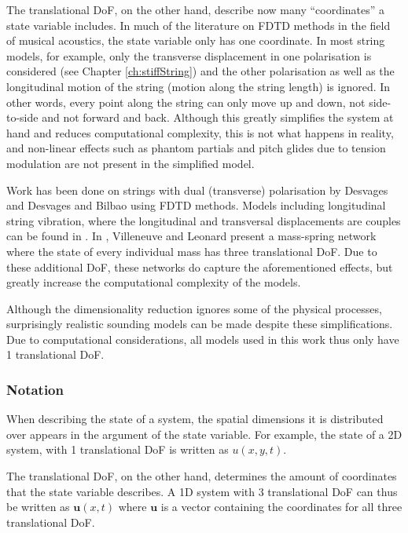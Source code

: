 The translational DoF, on the other hand, describe now many ``coordinates'' a state variable includes. 
In much of the literature on FDTD methods in the field of musical acoustics, the state variable only has one coordinate. In most string models, for example, only the transverse displacement in one polarisation is considered (see Chapter \ref{ch:stiffString}) and the other polarisation as well as the longitudinal motion of the string (motion along the string length) is ignored. In other words, every point along the string can only move up and down, not side-to-side and not forward and back. Although this greatly simplifies the system at hand and reduces computational complexity, this is not what happens in reality, and non-linear effects such as phantom partials and pitch glides due to tension modulation are not present in the simplified model. 

Work has been done on strings with dual (transverse) polarisation by Desvages \cite{Desvages2018} and Desvages and Bilbao \cite{Desvages2016} using FDTD methods. Models including longitudinal string vibration, where the longitudinal and transversal displacements are couples can be found in \cite{theBible,Bilbao2009spring}.
In \cite{Villeneuve2019}, Villeneuve and Leonard present a mass-spring network where the state of every individual mass has three translational DoF. Due to these additional DoF, these networks do capture the aforementioned effects, but greatly increase the computational complexity of the models. 

Although the dimensionality reduction ignores some of the physical processes, surprisingly realistic sounding models can be made despite these simplifications. Due to computational considerations, all models used in this work thus only have 1 translational DoF.

\subsubsection{Notation}
When describing the state of a system, the spatial dimensions it is distributed over appears in the argument of the state variable. For example, the state of a 2D system, with 1 translational DoF is written as $u(x,y,t)$.

The translational DoF, on the other hand, determines the amount of coordinates that the state variable describes. A 1D system with 3 translational DoF can thus be written as $\mathbf{u}(x,t)$ where $\mathbf{u}$ is a vector containing the coordinates for all three translational DoF.  

